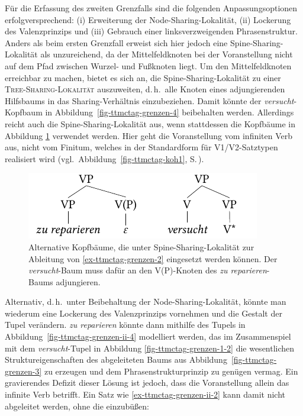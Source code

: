 Für die Erfassung des zweiten Grenzfalls sind die folgenden Anpassungsoptionen erfolgversprechend: (i) Erweiterung der Node-Sharing-Lokalität, (ii) Lockerung des Valenzprinzips und (iii) Gebrauch einer linksverzweigenden Phrasenstruktur. Anders als beim ersten Grenzfall erweist sich hier jedoch eine Spine-Sharing-Lokalität als unzureichend, da der Mittelfeldknoten bei der Voranstellung nicht auf dem Pfad zwischen Wurzel- und Fu\ss knoten liegt. Um den Mittelfeldknoten erreichbar zu machen, bietet es sich an, die Spine-Sharing-Lokalität zu einer \textsc{Tree-Sharing-Lokalität} auszuweiten, d.\,h.\ alle Knoten eines adjungierenden Hilfsbaums in das Sharing-Verhältnis einzubeziehen. Damit könnte der {\it versucht}-Kopfbaum in Abbildung~\ref{fig-ttmctag-grenzen-4} beibehalten werden. Allerdings reicht auch die Spine-Sharing-Lokalität aus, wenn stattdessen die Kopfbäume in Abbildung \ref{fig-ttmctag-grenzen-ii-3} verwendet werden. Hier geht die Voranstellung vom infiniten Verb aus, nicht vom Finitum, welches in der Standardform für V1/V2-Satztypen realisiert wird (vgl.\ Abbildung~\ref{fig-ttmctag-koh1}, S.\,\pageref{fig-ttmctag-koh1}).  

\begin{figure}[t]
\centering
\includegraphics{graphics/abb733.pdf}
\caption{\label{fig-ttmctag-grenzen-ii-3}Alternative Kopfbäume, die unter Spine-Sharing-Lokalität zur Ableitung von \ref{ex-ttmctag-grenzen-2} eingesetzt werden können. Der \textit{versucht}-Baum muss dafür an den V(P)-Knoten des \textit{zu reparieren}-Baums adjungieren.}
\end{figure}

Alternativ, d.\,h.\ unter Beibehaltung der Node-Sharing-Lokalität, könnte man wiederum eine Lockerung des Valenzprinzips vornehmen und die Gestalt der Tupel verändern. {\it zu reparieren} könnte dann mithilfe des Tupels in Abbildung~\ref{fig-ttmctag-grenzen-ii-4} modelliert werden, das im Zusammenspiel mit dem {\it versucht}-Tupel in Abbildung \ref{fig-ttmctag-grenzen-1-2} die wesentlichen Struktureigenschaften des abgeleiteten Baums aus Abbildung~\ref{fig-ttmctag-grenzen-3} zu erzeugen und dem Phrasenstrukturprinzip zu genügen vermag. Ein gravierendes Defizit dieser Lösung ist jedoch, dass die Voranstellung allein das infinite Verb betrifft. Ein Satz wie \ref{ex-ttmctag-grenzen-ii-2} kann damit nicht abgeleitet werden, ohne die  einzubüßen:

